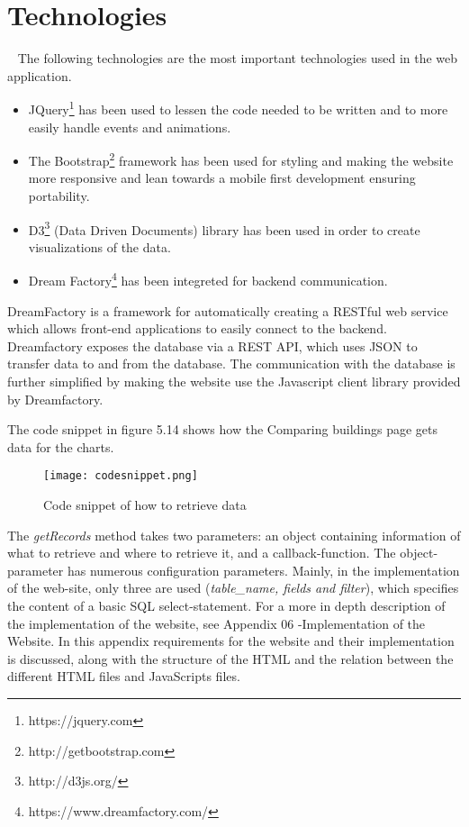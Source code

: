 \section*{Technologies}
~\newline
The following technologies are the most important technologies used in the web application.
\begin{itemize}
\item JQuery\footnote{https://jquery.com} has been used to lessen the code needed to be written and to more easily handle events and animations.
\item The Bootstrap\footnote{http://getbootstrap.com} framework has been used for styling and making the website more responsive and lean towards a mobile first development ensuring portability.
\item D3\footnote{http://d3js.org/} (Data Driven Documents) library has been used in order to create visualizations of the data.
\item Dream Factory\footnote{https://www.dreamfactory.com/} has been integreted for backend communication.
\end{itemize}
DreamFactory is a framework for automatically creating a RESTful web service which allows front-end applications to easily connect to the backend. Dreamfactory exposes the database via a REST API, which uses JSON to transfer data to and from the database. The communication with the database is further simplified by making the website use the Javascript client library provided by Dreamfactory.

The code snippet in figure 5.14 shows how the Comparing buildings page gets data for the charts.
\begin{figure}
\begin{center}
\texttt{[image: codesnippet.png]}
\end{center}
\caption{Code snippet of how to retrieve data}
\end{figure}
The \emph{getRecords} method takes two parameters: an object containing information of what to retrieve and where to retrieve it, and a callback-function.
The object-parameter has numerous configuration parameters. Mainly, in the implementation of the web-site, only three are used (\emph{table\_name, fields and filter}), which specifies the content of a basic SQL select-statement.
\newline
\newline
For a more in depth description of the implementation of the website, see Appendix 06 -Implementation of the Website. In this appendix requirements for the website and their implementation is discussed, along with the structure of the HTML and the relation between the different HTML files and JavaScripts files.
